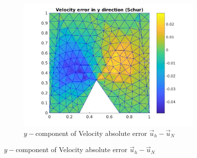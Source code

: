 \documentclass[graybox]{svmult}
\begin{document}
\begin{figure}
\begin{subfigure}{0.31\textwidth}
\includegraphics[width=\linewidth]{velocity_error_2_at_47_33.jpg}
\caption{$y-$component of Velocity absolute error $\overrightarrow{u}_h-\overrightarrow{u}_N$} \label{error_y_vel}
\end{subfigure}


\end{figure}
\end{document}
